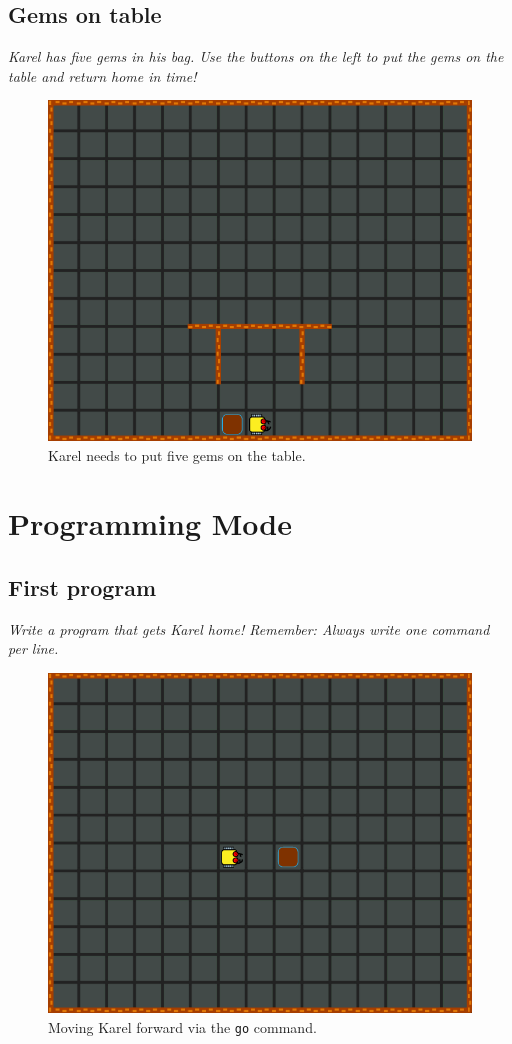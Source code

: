 \subsection{Gems on table}

{\em Karel has five gems in his bag. Use the buttons on the left to put the gems on the table and 
return home in time!}

\begin{figure}[!ht]
\begin{center}
\includegraphics[height=0.4\textwidth]{img/a13.png}
\end{center}
\vspace{-4mm}
\caption{Karel needs to put five gems on the table.}
\label{fig:a13}
\vspace{-4mm}
\end{figure}
\noindent


\section{Programming Mode}



\subsection{First program}

{\em Write a program that gets Karel home! Remember: Always write one command per line.}

\begin{figure}[!ht]
\begin{center}
\includegraphics[height=0.4\textwidth]{img/b01.png}
\end{center}
\vspace{-4mm}
\caption{Moving Karel forward via the {\tt go} command.}
\label{fig:b01}
\vspace{-4mm}
\end{figure}
\noindent



